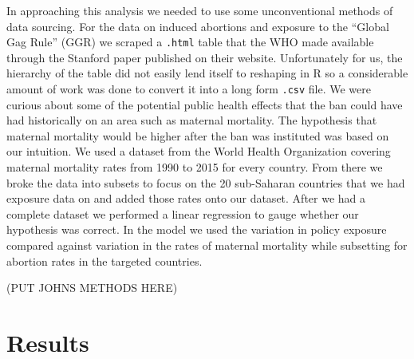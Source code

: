 \documentclass[11pt,]{article}
\begin{document}
In approaching this analysis we needed to use some unconventional
methods of data sourcing. For the data on induced abortions and exposure
to the ``Global Gag Rule'' (GGR) we scraped a \texttt{.html} table that
the WHO made available through the Stanford paper published on their
website. Unfortunately for us, the hierarchy of the table did not easily
lend itself to reshaping in R so a considerable amount of work was done
to convert it into a long form \texttt{.csv} file. We were curious about
some of the potential public health effects that the ban could have had
historically on an area such as maternal mortality. The hypothesis that
maternal mortality would be higher after the ban was instituted was
based on our intuition. We used a dataset from the World Health
Organization covering maternal mortality rates from 1990 to 2015 for
every country. From there we broke the data into subsets to focus on the
20 sub-Saharan countries that we had exposure data on and added those
rates onto our dataset. After we had a complete dataset we performed a
linear regression to gauge whether our hypothesis was correct. In the
model we used the variation in policy exposure compared against
variation in the rates of maternal mortality while subsetting for
abortion rates in the targeted countries.

(PUT JOHNS METHODS HERE)

\section{Results}\label{results}
\end{document}
